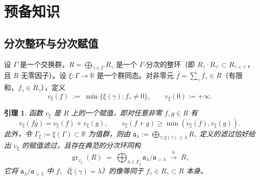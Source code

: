 \documentclass[11pt,a4paper]{article}
\newtheorem{lemma}[theorem]{引理}
\theoremstyle{definition}
\theoremstyle{remark}
\DeclareMathOperator{\gr}{gr}
\newcommand{\R}{\mathbb{R}}
\begin{document}
\section{预备知识}

\subsection{分次整环与分次赋值}

设 $\Gamma$ 是一个交换群，$R=\bigoplus_{\gamma\in\Gamma} R_\gamma$ 是一个 $\Gamma$-分次的整环（即 $R_\gamma\cdot R_{\gamma'}\subset R_{\gamma+\gamma'}$，且 $R$ 无零因子）。设 $\xi:\Gamma\to\R$ 是一个群同态。对非零元 $f=\sum_\gamma f_\gamma\in R$（有限和，$f_\gamma\in R_\gamma$），定义
\[
v_\xi(f) \;:=\; \min\{\xi(\gamma) : f_\gamma\neq 0\}, \qquad v_\xi(0):=+\infty.
\]

\begin{lemma}\label{lem:main}
函数 $v_\xi$ 是 $R$ 上的一个赋值，即对任意非零 $f,g\in R$ 有
\[
v_\xi(fg)=v_\xi(f)+v_\xi(g), \qquad v_\xi(f+g)\ge \min(v_\xi(f),v_\xi(g)).
\]
此外，令 $\Gamma_\xi:=\xi(\Gamma)\subset\R$ 为值群，则由 $\mathfrak a_\lambda:=\bigoplus_{\gamma:\xi(\gamma)\ge\lambda} R_\gamma$ 定义的滤过恰好给出 $v_\xi$ 的赋值滤过，且存在典范的分次环同构
\[
\gr_{v_\xi}(R) \;=\; \bigoplus_{\lambda\in\Gamma_\xi} \mathfrak a_\lambda/\mathfrak a_{>\lambda} \;\xrightarrow{\ \cong\ }\; R,
\]
它将 $\mathfrak a_\lambda/\mathfrak a_{>\lambda}$ 中 $f_\gamma$（$\xi(\gamma)=\lambda$）的像等同于 $f_\gamma\in R_\gamma\subset R$ 本身。
\end{lemma}
\end{document}

